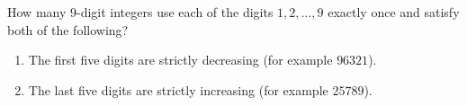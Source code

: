 How many $9$-digit integers use each of the digits $1,2,\dots,9$ exactly once and satisfy both of the following?
\begin{enumerate}
\item The first five digits are strictly decreasing (for example $96321$).
\item The last five digits are strictly increasing (for example $25789$).
\end{enumerate}
